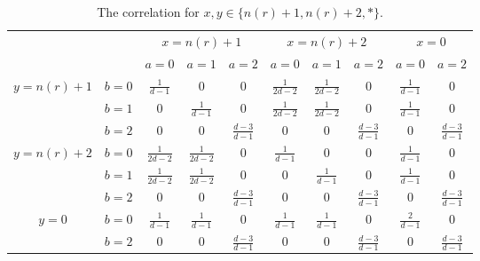 \documentclass[11pt,letterpaper]{article}
\newcommand{\1}{\mathbb{1}}
\newcommand{\nr}{n(r)}
\theoremstyle{definition}
\begin{document}
\begin{table}[H]
\begin{center}
\begin{tabular}{|c|c||c|c|c|c|c|c|c|c|}
\hline
\multicolumn{2}{|c|}{} &
\multicolumn{3}{|c|}{$x=\nr+1$}&
\multicolumn{3}{|c|}{$x=\nr+2$}&
\multicolumn{2}{|c|}{$x=0$}\\
\cline{3-10}
\multicolumn{2}{|c|}{} &
$a = 0$ & $a=1$ & $a=2$ &
$a = 0$ & $a=1$ & $a=2$ &
$a = 0$ & $a =2 $\\
\hline
\hline
\multirow{3}{*}{$y = \nr+1$} & $b=0$ & $\frac{1}{d-1}$ & $0$ & 0 
& $\frac{1}{2d-2}$ & $\frac{1}{2d-2}$ & 0 & $\frac{1}{d-1}$ & 0 \\
\cline{2-10}
&$b=1$ & 0 & $\frac{1}{d-1}$ & $0$ 
&  $\frac{1}{2d-2}$ & $\frac{1}{2d-2}$ & 0 &$\frac{1}{d-1}$ & 0 \\
\cline{2-10}
&$b=2$ & 0 & 0 & $\frac{d-3}{d-1}$ 
&  0 & 0 &  $\frac{d-3}{d-1} $ &0 & $\frac{d-3}{d-1}$ \\
\hline
\multirow{3}{*}{$y = \nr+2$} & $b=0$ & $\frac{1}{2d-2}$ & $\frac{1}{2d-2}$ & 0 
& $\frac{1}{d-1}$ & $0$ & 0 & $\frac{1}{d-1}$ & 0 \\
\cline{2-10}
&$b=1$ & $\frac{1}{2d-2}$ & $\frac{1}{2d-2}$ & $0$ 
&  0 & $\frac{1}{d-1}$ & $0$ &$\frac{1}{d-1}$ & 0 \\
\cline{2-10}
&$b=2$ & 0 & 0 & \small $\frac{d-3}{d-1}$ 
&  0 & 0 & \small $\frac{d-3}{d-1} $ &0 &\small $\frac{d-3}{d-1}$ \\
\hline
\multirow{2}{*}{$y = 0$} & $b=0$ & $\frac{1}{d-1}$ & $\frac{1}{d-1}$ & 0 
& $\frac{1}{d-1}$ & $\frac{1}{d-1}$ & 0 & $\frac{2}{d-1}$ & 0 \\
\cline{2-10}
&$b=2$ & 0 & 0 & $\frac{d-3}{d-1}$ 
&  0 & 0 & \small $\frac{d-3}{d-1} $ &0 & \small $\frac{d-3}{d-1}$ \\
\hline
\end{tabular}
\end{center}
\caption{The correlation for $x ,y\in\{\nr+1,\nr+2, \ast\} $.}
\end{table}
\end{document}
